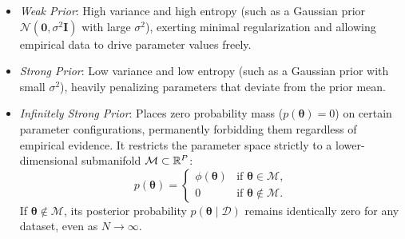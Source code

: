\begin{itemize}[leftmargin=*]
  \item \textit{Weak Prior}: High variance and high entropy (such as a Gaussian prior $\mathcal{N}(\mathbf{0}, \sigma^2 \mathbf{I})$ with large $\sigma^2$), exerting minimal regularization and allowing empirical data to drive parameter values freely.
  \item \textit{Strong Prior}: Low variance and low entropy (such as a Gaussian prior with small $\sigma^2$), heavily penalizing parameters that deviate from the prior mean.
  \item \textit{Infinitely Strong Prior}: Places zero probability mass ($p(\boldsymbol{\theta}) = 0$) on certain parameter configurations, permanently forbidding them regardless of empirical evidence. It restricts the parameter space strictly to a lower-dimensional submanifold $\mathcal{M} \subset \mathbb{R}^P$:
    \begin{equation}
    p(\boldsymbol{\theta}) = 
    \begin{cases}
      \phi(\boldsymbol{\theta}) & \text{if } \boldsymbol{\theta} \in \mathcal{M}, \\
      0 & \text{if } \boldsymbol{\theta} \notin \mathcal{M}.
    \end{cases}
    \label{eq:infinitely_strong_prior_support}
    \end{equation}
    If $\boldsymbol{\theta} \notin \mathcal{M}$, its posterior probability $p(\boldsymbol{\theta} \mid \mathcal{D})$ remains identically zero for any dataset, even as $N \to \infty$.
\end{itemize}

